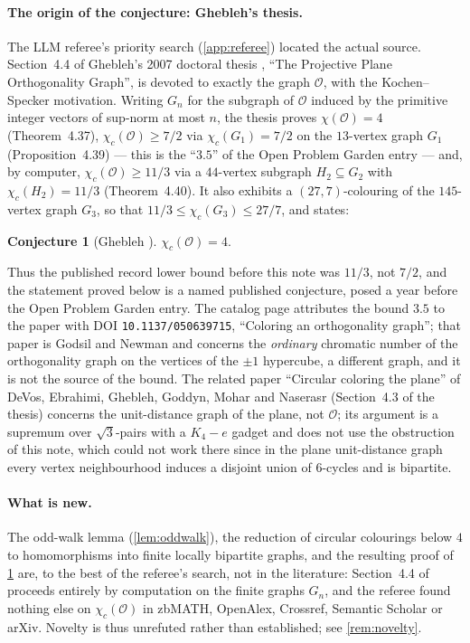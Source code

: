 \documentclass[11pt,a4paper]{article}
\theoremstyle{plain}
\theoremstyle{definition}
\newtheorem{conjecture}[theorem]{Conjecture}
\theoremstyle{remark}
\newcommand{\cO}{\mathcal O}
\newcommand{\chic}{\chi_c}
\begin{document}
\paragraph{The origin of the conjecture: Ghebleh's thesis.}\label{par:ghebleh}
The LLM referee's priority search (\cref{app:referee}) located the actual source. Section~4.4 of Ghebleh's 2007 doctoral thesis \cite{Ghebleh07}, ``The Projective Plane Orthogonality Graph'', is devoted to exactly the graph $\cO$, with the Kochen--Specker motivation. Writing $G_n$ for the subgraph of $\cO$ induced by the primitive integer vectors of sup-norm at most $n$, the thesis proves $\chi(\cO)=4$ (Theorem~4.37), $\chic(\cO)\ge 7/2$ via $\chic(G_1)=7/2$ on the $13$-vertex graph $G_1$ (Proposition~4.39) --- this is the ``$3.5$'' of the Open Problem Garden entry --- and, by computer, $\chic(\cO)\ge 11/3$ via a $44$-vertex subgraph $H_2\subseteq G_2$ with $\chic(H_2)=11/3$ (Theorem~4.40). It also exhibits a $(27,7)$-colouring of the $145$-vertex graph $G_3$, so that $11/3\le\chic(G_3)\le 27/7$, and states:

\begin{conjecture}[{Ghebleh \cite[Conjecture~4.41]{Ghebleh07}}]\label{conj:441}
$\chic(\cO)=4$.
\end{conjecture}

Thus the published record lower bound before this note was $11/3$, not $7/2$, and the statement proved below is a named published conjecture, posed a year before the Open Problem Garden entry. The catalog page attributes the bound $3.5$ to the paper with DOI \texttt{10.1137/050639715}, ``Coloring an orthogonality graph''; that paper is Godsil and Newman \cite{GN08} and concerns the \emph{ordinary} chromatic number of the orthogonality graph on the vertices of the $\pm1$ hypercube, a different graph, and it is not the source of the bound. The related paper ``Circular coloring the plane'' of DeVos, Ebrahimi, Ghebleh, Goddyn, Mohar and Naserasr \cite{DEGGMN07} (Section~4.3 of the thesis) concerns the unit-distance graph of the plane, not $\cO$; its argument is a supremum over $\sqrt3$-pairs with a $K_4-e$ gadget and does not use the obstruction of this note, which could not work there since in the plane unit-distance graph every vertex neighbourhood induces a disjoint union of $6$-cycles and is bipartite.

\paragraph{What is new.} The odd-walk lemma (\cref{lem:oddwalk}), the reduction of circular colourings below $4$ to homomorphisms into finite locally bipartite graphs, and the resulting proof of \cref{conj:441} are, to the best of the referee's search, not in the literature: Section~4.4 of \cite{Ghebleh07} proceeds entirely by computation on the finite graphs $G_n$, and the referee found nothing else on $\chic(\cO)$ in zbMATH, OpenAlex, Crossref, Semantic Scholar or arXiv. Novelty is thus unrefuted rather than established; see \cref{rem:novelty}.
\end{document}
